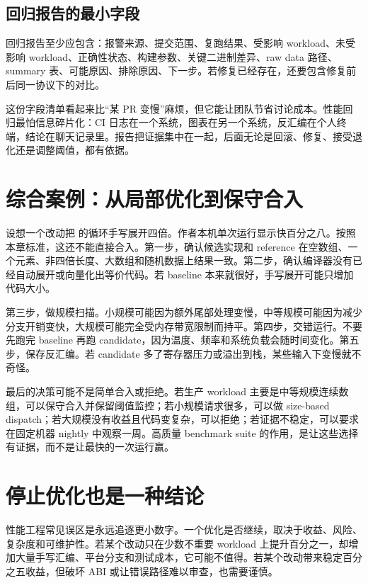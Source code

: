 \subsection{回归报告的最小字段}

回归报告至少应包含：报警来源、提交范围、复跑结果、受影响 workload、未受影响 workload、正确性状态、构建参数、关键二进制差异、raw data 路径、summary 表、可能原因、排除原因、下一步。若修复已经存在，还要包含修复前后同一协议下的对比。

这份字段清单看起来比“某 PR 变慢”麻烦，但它能让团队节省讨论成本。性能回归最怕信息碎片化：CI 日志在一个系统，图表在另一个系统，反汇编在个人终端，结论在聊天记录里。报告把证据集中在一起，后面无论是回滚、修复、接受退化还是调整阈值，都有依据。

\section{综合案例：从局部优化到保守合入}

设想一个改动把  的循环手写展开四倍。作者本机单次运行显示快百分之八。按照本章标准，这还不能直接合入。第一步，确认候选实现和 reference 在空数组、一个元素、非四倍长度、大数组和随机数据上结果一致。第二步，确认编译器没有已经自动展开或向量化出等价代码。若 baseline 本来就很好，手写展开可能只增加代码大小。

第三步，做规模扫描。小规模可能因为额外尾部处理变慢，中等规模可能因为减少分支开销变快，大规模可能完全受内存带宽限制而持平。第四步，交错运行。不要先跑完 baseline 再跑 candidate，因为温度、频率和系统负载会随时间变化。第五步，保存反汇编。若 candidate 多了寄存器压力或溢出到栈，某些输入下变慢就不奇怪。

最后的决策可能不是简单合入或拒绝。若生产 workload 主要是中等规模连续数组，可以保守合入并保留阈值监控；若小规模请求很多，可以做 size-based dispatch；若大规模没有收益且代码变复杂，可以拒绝；若证据不稳定，可以要求在固定机器 nightly 中观察一周。高质量 benchmark suite 的作用，是让这些选择有证据，而不是让最快的一次运行赢。

\section{停止优化也是一种结论}

性能工程常见误区是永远追逐更小数字。一个优化是否继续，取决于收益、风险、复杂度和可维护性。若某个改动只在少数不重要 workload 上提升百分之一，却增加大量手写汇编、平台分支和测试成本，它可能不值得。若某个改动带来稳定百分之五收益，但破坏 ABI 或让错误路径难以审查，也需要谨慎。

